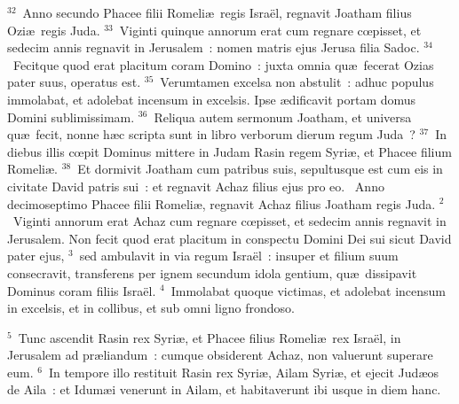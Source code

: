 ${}^{32}$~Anno secundo Phacee filii Romeli\ae\ regis Isra\"el, regnavit Joatham filius Ozi\ae\ regis Juda.
${}^{33}$~Viginti quinque annorum erat cum regnare cœpisset, et sedecim annis regnavit in Jerusalem~: nomen matris ejus Jerusa filia Sadoc.
${}^{34}$~Fecitque quod erat placitum coram Domino~: juxta omnia qu\ae\ fecerat Ozias pater suus, operatus est.
${}^{35}$~Verumtamen excelsa non abstulit~: adhuc populus immolabat, et adolebat incensum in excelsis. Ipse \ae dificavit portam domus Domini sublimissimam.
${}^{36}$~Reliqua autem sermonum Joatham, et universa qu\ae\ fecit, nonne h\ae c scripta sunt in libro verborum dierum regum Juda~?
${}^{37}$~In diebus illis cœpit Dominus mittere in Judam Rasin regem Syri\ae , et Phacee filium Romeli\ae .
${}^{38}$~Et dormivit Joatham cum patribus suis, sepultusque est cum eis in civitate David patris sui~: et regnavit Achaz filius ejus pro eo.
~\lettrine[lines=10,image=true,loversize=0.05,lraise=-0.03]{A}{}nno decimoseptimo Phacee filii Romeli\ae , regnavit Achaz filius Joatham regis Juda.
${}^{2}$~Viginti annorum erat Achaz cum regnare cœpisset, et sedecim annis regnavit in Jerusalem. Non fecit quod erat placitum in conspectu Domini Dei sui sicut David pater ejus,
${}^{3}$~sed ambulavit in via regum Isra\"el~: insuper et filium suum consecravit, transferens per ignem secundum idola gentium, qu\ae\ dissipavit Dominus coram filiis Isra\"el.
${}^{4}$~Immolabat quoque victimas, et adolebat incensum in excelsis, et in collibus, et sub omni ligno frondoso.


${}^{5}$~Tunc ascendit Rasin rex Syri\ae , et Phacee filius Romeli\ae\ rex Isra\"el, in Jerusalem ad pr\ae liandum~: cumque obsiderent Achaz, non valuerunt superare eum.
${}^{6}$~In tempore illo restituit Rasin rex Syri\ae , Ailam Syri\ae , et ejecit Jud\ae os de Aila~: et Idum\ae i venerunt in Ailam, et habitaverunt ibi usque in diem hanc.


